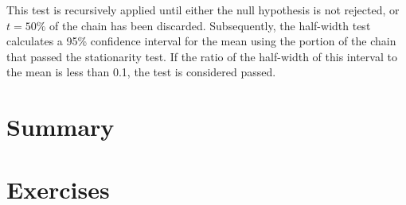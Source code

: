 This test is recursively applied until either the null hypothesis is not rejected, or $t = 50\%$ of the chain has been discarded. Subsequently, the half-width test calculates a 95\% confidence interval for the mean using the portion of the chain that passed the stationarity test. If the ratio of the half-width of this interval to the mean is less than 0.1, the test is considered passed.\\


\section{Summary}\label{sec55}


\section{Exercises}\label{sec56}

